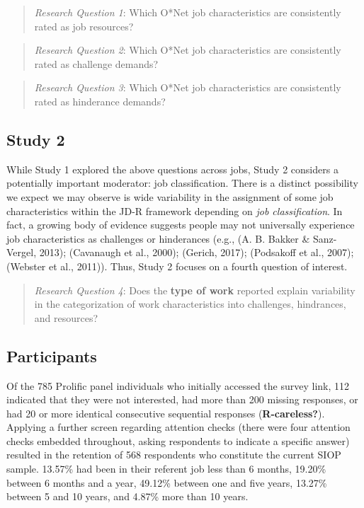 \documentclass[
  english,
  man]{apa6}
\begin{document}
\begin{quote}
\emph{Research Question 1}: Which O*Net job characteristics are consistently rated as job resources?
\end{quote}

\begin{quote}
\emph{Research Question 2}: Which O*Net job characteristics are consistently rated as challenge demands?
\end{quote}

\begin{quote}
\emph{Research Question 3}: Which O*Net job characteristics are consistently rated as hinderance demands?
\end{quote}

\hypertarget{study-2}{%
\subsection{Study 2}\label{study-2}}

While Study 1 explored the above questions across jobs, Study 2 considers a potentially important moderator: job classification. There is a distinct possibility we expect we may observe is wide variability in the assignment of some job characteristics within the JD-R framework depending on \emph{job classification}. In fact, a growing body of evidence suggests people may not universally experience job characteristics as challenges or hinderances (e.g., (A. B. Bakker \& Sanz-Vergel, 2013); (Cavanaugh et al., 2000); (Gerich, 2017); (Podsakoff et al., 2007); (Webster et al., 2011)). Thus, Study 2 focuses on a fourth question of interest.

\begin{quote}
\emph{Research Question 4}: Does the \textbf{type of work} reported explain variability in the categorization of work characteristics into challenges, hindrances, and resources?
\end{quote}

\hypertarget{participants}{%
\subsection{Participants}\label{participants}}

Of the 785 Prolific panel individuals who initially accessed the survey link, 112 indicated that they were not interested, had more than 200 missing responses, or had 20 or more identical consecutive sequential responses (\textbf{R-careless?}). Applying a further screen regarding attention checks (there were four attention checks embedded throughout, asking respondents to indicate a specific answer) resulted in the retention of 568 respondents who constitute the current SIOP sample. 13.57\% had been in their referent job less than 6 months, 19.20\% between 6 months and a year, 49.12\% between one and five years, 13.27\% between 5 and 10 years, and 4.87\% more than 10 years.
\end{document}
